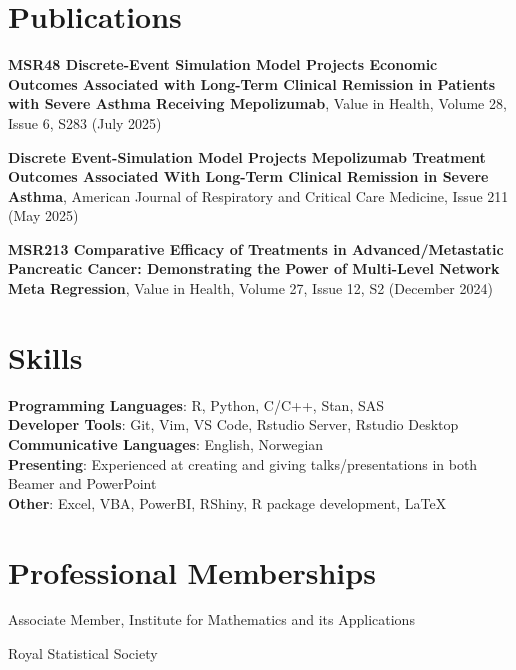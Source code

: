 \documentclass[letterpaper,11pt]{article}
\begin{document}
\section{Publications}
\begin{itemize}[leftmargin=0.15in, label={}]
    \small{
\item{\textbf{MSR48 Discrete-Event Simulation Model Projects Economic Outcomes Associated with Long-Term Clinical Remission in Patients with Severe Asthma Receiving Mepolizumab}, Value in Health, Volume 28, Issue 6, S283 (July 2025)}

\item{\textbf{Discrete Event-Simulation Model Projects Mepolizumab Treatment Outcomes Associated With Long-Term Clinical Remission in Severe Asthma}, American Journal of Respiratory and Critical Care Medicine, Issue 211 (May 2025)}

\item{\textbf{MSR213 Comparative Efficacy of Treatments in Advanced/Metastatic Pancreatic Cancer: Demonstrating the Power of Multi-Level Network Meta Regression}, Value in Health, Volume 27, Issue 12, S2 (December 2024)}}
\end{itemize}

\section{Skills}
 \begin{itemize}[leftmargin=0.15in, label={}]
    \small{\item{
     \textbf{Programming Languages}{: R, Python, C/C++, Stan, SAS} \\
     \textbf{Developer Tools}{: Git, Vim,  VS Code, Rstudio Server, Rstudio Desktop} \\
     \textbf{Communicative Languages}: English, Norwegian \\
     \textbf{Presenting}{: Experienced at creating and giving talks/presentations in both Beamer and PowerPoint} \\
    \textbf{Other}{: Excel, VBA, PowerBI, RShiny, R package development, \LaTeX}
    }}
\end{itemize}

\section{Professional Memberships}
\begin{itemize}[leftmargin=0.15in, label={}]
    \small{\item{Associate Member, Institute for Mathematics and its Applications} \\
           \item{Royal Statistical Society}}
\end{itemize}

\end{document}
